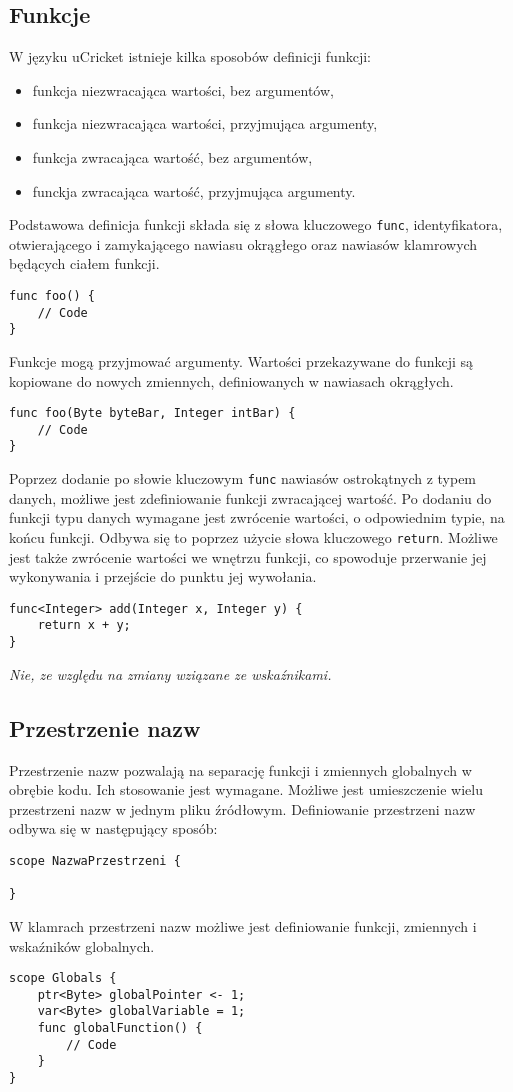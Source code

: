 \subsection{Funkcje}
W języku uCricket istnieje kilka sposobów definicji funkcji:
\begin{itemize}
\item funkcja niezwracająca wartości, bez argumentów,
\item funkcja niezwracająca wartości, przyjmująca argumenty,
\item funkcja zwracająca wartość, bez argumentów,
\item funckja zwracająca wartość, przyjmująca argumenty. 
\end{itemize}

Podstawowa definicja funkcji składa się z słowa kluczowego \lstinline|func|, identyfikatora, otwierającego i zamykającego nawiasu okrągłego oraz nawiasów klamrowych będących ciałem funkcji.
\begin{lstlisting}
func foo() {
	// Code
}
\end{lstlisting}

Funkcje mogą przyjmować argumenty. Wartości przekazywane do funkcji są kopiowane do nowych zmiennych, definiowanych w nawiasach okrągłych.
\begin{lstlisting}
func foo(Byte byteBar, Integer intBar) {
	// Code
}
\end{lstlisting}

Poprzez dodanie po słowie kluczowym \lstinline|func| nawiasów ostrokątnych z typem danych, możliwe jest zdefiniowanie funkcji zwracającej wartość. Po dodaniu do funkcji typu danych wymagane jest zwrócenie wartości, o odpowiednim typie, na końcu funkcji. Odbywa się to poprzez użycie słowa kluczowego \lstinline|return|. Możliwe jest także zwrócenie wartości we wnętrzu funkcji, co spowoduje przerwanie jej wykonywania i przejście do punktu jej wywołania.
\begin{lstlisting}
func<Integer> add(Integer x, Integer y) {
	return x + y;
}
\end{lstlisting}
\textit{Nie, ze względu na zmiany wziązane ze wskaźnikami.} 
\subsection{Przestrzenie nazw}
Przestrzenie nazw pozwalają na separację funkcji i zmiennych globalnych w obrębie kodu. Ich stosowanie jest wymagane. Możliwe jest umieszczenie wielu przestrzeni nazw w jednym pliku źródłowym. Definiowanie przestrzeni nazw odbywa się w następujący sposób:
\begin{lstlisting}
scope NazwaPrzestrzeni {

}
\end{lstlisting}
W klamrach przestrzeni nazw możliwe jest definiowanie funkcji, zmiennych i wskaźników globalnych. 
\begin{lstlisting}
scope Globals {
	ptr<Byte> globalPointer <- 1;
	var<Byte> globalVariable = 1;
	func globalFunction() { 
		// Code	
	}
}
\end{lstlisting}

